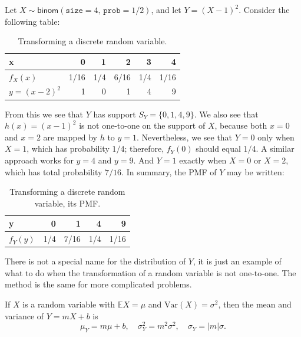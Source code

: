 \documentclass[captions=tableheading]{scrbook}
\begin{document}
\begin{example}
Let \(X\sim\mathsf{binom}(\mathtt{size}=4,\,\mathtt{prob}=1/2)\), and let \(Y=(X-1)^{2}\). Consider the following table:

\begin{table}[htb]
\caption[Transform discrete random variable]{Transforming a discrete random variable.} \label{tab-disc-transf}
\begin{center}
\begin{tabular}{lrrrrr}
 x                &     0  &    1  &     2  &    3  &     4  \\
\hline
 \(f_{X}(x)\)     &  1/16  &  1/4  &  6/16  &  1/4  &  1/16  \\
\hline
 \(y=(x-2)^{2}\)  &     1  &    0  &     1  &    4  &     9  \\
\end{tabular}
\end{center}
\end{table}


From this we see that \(Y\) has support \(S_{Y}=\{0,1,4,9\}\). We also see that \(h(x)=(x-1)^{2}\) is not one-to-one on the support of \(X\), because both \(x=0\) and \(x=2\) are mapped by \(h\) to \(y=1\). Nevertheless, we see that \(Y=0\) only when \(X=1\), which has probability \(1/4\); therefore, \(f_{Y}(0)\) should equal \(1/4\). A similar approach works for \(y=4\) and \(y=9\). And \(Y=1\) exactly when \(X=0\) or \(X=2\), which has total probability \(7/16\). In summary, the PMF of \(Y\) may be written:

\begin{table}[htb]
\caption[Transforming discrete random variable: PMF]{Transforming a discrete random variable, its PMF.} \label{tab-disc-transf-pmf}
\begin{center}
\begin{tabular}{lrrrr}
 y             &    0  &     1  &    4  &     9  \\
\hline
 \(f_{Y}(y)\)  &  1/4  &  7/16  &  1/4  &  1/16  \\
\end{tabular}
\end{center}
\end{table}


There is not a special name for the distribution of \(Y\), it is just an example of what to do when the transformation of a random variable is not one-to-one. The method is the same for more complicated problems.
\end{example}

\begin{prop}
If \(X\) is a random variable with \(\mathbb{E} X=\mu\) and \(\mbox{Var}(X)=\sigma^{2}\), then the mean and variance of \(Y=mX+b\) is
\begin{equation}
\mu_{Y}=m\mu+b,\quad \sigma_{Y}^{2}=m^{2}\sigma^{2},\quad \sigma_{Y}=|m|\sigma.
\end{equation}
\end{prop}
\end{document}
